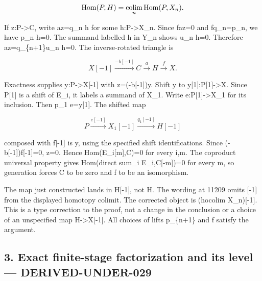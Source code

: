 \documentclass[11pt]{article}
\begin{document}
\[
 \operatorname{Hom}(P,H)=
 \mathop{\rm colim}_n\operatorname{Hom}(P,X_n).
\]

If z:\allowbreak{}P\allowbreak{}->C,\allowbreak{} write az\allowbreak{}=q\_\allowbreak{}n h for some h:\allowbreak{}P\allowbreak{}->X\_\allowbreak{}n. Since faz\allowbreak{}=0 and fq\_\allowbreak{}n\allowbreak{}=p\_\allowbreak{}n,\allowbreak{} we have p\_\allowbreak{}n h\allowbreak{}=0. The summand labelled h in Y\_\allowbreak{}n shows u\_\allowbreak{}n h\allowbreak{}=0. Therefore az\allowbreak{}=q\_\allowbreak{}\{n\allowbreak{}+1\}u\_\allowbreak{}n h\allowbreak{}=0. The inverse-rotated triangle is

\[
 X[-1]\xrightarrow{-b[-1]}C\xrightarrow a H\xrightarrow f X.
\]

Exactness supplies y:\allowbreak{}P\allowbreak{}->X[-1]\allowbreak{} with z\allowbreak{}=(-b[-1]\allowbreak{})\allowbreak{}y. Shift y to y[1]\allowbreak{}:\allowbreak{}P[1]\allowbreak{}\allowbreak{}->X. Since P[1]\allowbreak{} is a shift of E\_\allowbreak{}i,\allowbreak{} it labels a summand of X\_\allowbreak{}1. Write e:\allowbreak{}P[1]\allowbreak{}\allowbreak{}->X\_\allowbreak{}1 for its inclusion. Then p\_\allowbreak{}1 e\allowbreak{}=y[1]\allowbreak{}. The shifted map

\[
 P\xrightarrow{e[-1]}X_1[-1]\xrightarrow{q_1[-1]}H[-1]
\]

composed with f[-1]\allowbreak{} is y,\allowbreak{} using the specified shift identifications. Since (-b[-1]\allowbreak{})\allowbreak{}f[-1]\allowbreak{}\allowbreak{}=0,\allowbreak{} z\allowbreak{}=0. Hence Hom(E\_\allowbreak{}i[m]\allowbreak{},\allowbreak{}C)\allowbreak{}\allowbreak{}=0 for every i,\allowbreak{}m. The coproduct universal property gives Hom(direct sum\_\allowbreak{}i E\_\allowbreak{}i,\allowbreak{}C[-m]\allowbreak{})\allowbreak{}\allowbreak{}=0 for every m,\allowbreak{} so generation forces C to be zero and f to be an isomorphism.

The map just constructed lands in H[-1]\allowbreak{},\allowbreak{} not H. The wording at 11209 omits [-1]\allowbreak{} from the displayed homotopy colimit. The corrected object is (hocolim X\_\allowbreak{}n)\allowbreak{}[-1]\allowbreak{}. This is a type correction to the proof,\allowbreak{} not a change in the conclusion or a choice of an unspecified map H\allowbreak{}->X[-1]\allowbreak{}. All choices of lifts p\_\allowbreak{}\{n\allowbreak{}+1\} and f satisfy the argument.

\subsection{3. Exact finite-stage factorization and its level --- DERIVED-UNDER-029}\label{proofs-11121-11450-exact-finite-stage-factorization-and-its-level-derived-under-029}
\end{document}
